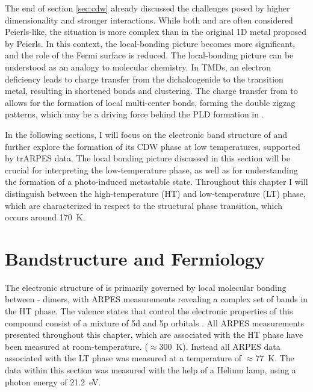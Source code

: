 The end of section \ref{sec:cdw} already discussed the challenges posed by higher dimensionality and stronger interactions.
While both  and  are often considered Peierls-like, the situation is more complex than in the original 1D metal proposed by Peierls.
In this context, the local-bonding picture becomes more significant, and the role of the Fermi surface is reduced.
The local-bonding picture can be understood as an analogy to molecular chemistry.
In TMDs, an electron deficiency leads to charge transfer from the dichalcogenide to the transition metal, resulting in shortened bonds and clustering.
The charge transfer from  to  allows for the formation of local multi-center bonds, forming the double zigzag patterns, which may be a driving force behind the PLD formation in  \cite{pouget_structural_2024, whangbo_analogies_1992, canadell_importance_1992, albright_thomas_a_orbital_2013}.

In the following sections, I will focus on the electronic band structure of  and further explore the formation of its CDW phase at low temperatures, supported by trARPES data.
The local bonding picture discussed in this section will be crucial for interpreting the low-temperature phase, as well as for understanding the formation of a photo-induced metastable state.
Throughout this chapter I will distinguish between the high-temperature (HT) and low-temperature (LT) phase, which are characterized in respect to the structural phase transition, which occurs around \qty{170}{\kelvin}.

\section{Bandstructure and Fermiology}

The electronic structure of  is primarily governed by local molecular bonding between - dimers, with ARPES measurements revealing a complex set of bands in the HT phase.
The valence states that control the electronic properties of this compound consist of a mixture of  5d and  5p orbitals \cite{mitsuishi_unveiling_2024}.
All ARPES measurements presented throughout this chapter, which are associated with the HT phase have been measured at room-temperature. ($\approx$\qty{300}{\kelvin}).
Instead all ARPES data associated with the LT phase was measured at a temperature of $\approx$\qty{77}{\kelvin}.
The data within this section was measured with the help of a Helium lamp, using a photon energy of \qty{21.2}{\electronvolt}.

